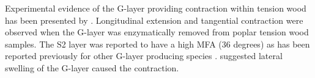 Experimental evidence of the G-layer providing contraction within tension wood
has been presented by \citet{Goswami_2008}. Longitudinal extension and tangential
contraction were observed when the G-layer was enzymatically removed from
poplar tension wood samples. The S2 layer was reported to have a high MFA (36
degrees) as has been reported previously for other G-layer producing species
\citep{M_ller_2006}. \citet{Goswami_2008} suggested lateral swelling of the G-layer caused the
contraction.
